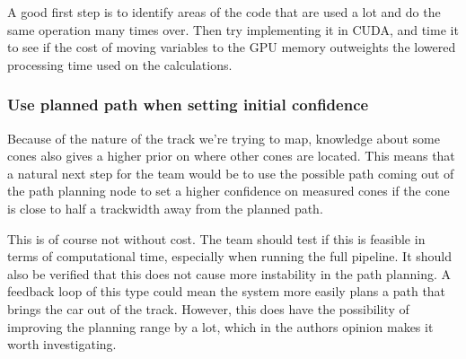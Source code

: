 A good first step is to identify areas of the code that are used a lot and do the same operation many times over. Then try implementing it in CUDA, and time it to see if the cost of moving variables to the GPU memory outweights the lowered processing time used on the calculations. 

\subsubsection{Use planned path when setting initial confidence}
Because of the nature of the track we're trying to map, knowledge about some cones also gives a higher prior on where other cones are located. This means that a natural next step for the team would be to use the possible path coming out of the path planning node to set a higher confidence on measured cones if the cone is close to half a trackwidth away from the planned path. 

This is of course not without cost. The team should test if this is feasible in terms of computational time, especially when running the full pipeline. It should also be verified that this does not cause more instability in the path planning. A feedback loop of this type could mean the system more easily plans a path that brings the car out of the track. However, this does have the possibility of improving the planning range by a lot, which in the authors opinion makes it worth investigating.